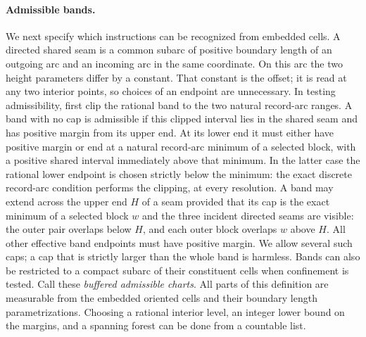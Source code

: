 \paragraph{Admissible bands.}
We next specify which instructions can be recognized from embedded cells.
A directed shared seam is a common subarc of positive boundary length
of an outgoing arc and an incoming arc in the same coordinate.  On this
arc the two height parameters differ by a constant.  That constant is
the offset; it is read at any two interior points, so choices of an
endpoint are unnecessary.  In testing admissibility, first clip the
rational band to the two natural record-arc ranges.  A band with no
cap is admissible if this clipped interval lies in the shared seam
and has positive margin from its upper end.  At its lower end it
must either have positive margin or end at a natural record-arc
minimum of a selected block, with a positive shared interval immediately
above that minimum.  In the latter case the rational lower endpoint
is chosen strictly below the minimum: the exact discrete record-arc
condition performs the clipping, at every resolution.  A band may
extend across the upper end $H$ of a seam
provided that its cap is the exact minimum of a selected block $w$
and the three incident directed seams are visible: the outer pair
overlaps below $H$, and each outer block overlaps $w$ above $H$.
All other effective band endpoints must have positive margin.  We allow several
such caps; a cap that is strictly larger than the whole band is harmless.
Bands can also be restricted to a compact subarc of their constituent
cells when confinement is tested.  Call these \emph{buffered admissible
charts}.  All parts of this definition are measurable from the embedded
oriented cells and their boundary length parametrizations.  Choosing a
rational interior level, an integer lower bound on the margins, and a
spanning forest can be done from a countable list.

